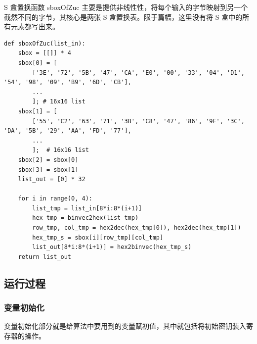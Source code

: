 \vspace*{0.5\baselineskip}
S 盒置换函数 { \cnsls sboxOfZuc} 主要是提供非线性性，将每个输入的字节映射到另一个截然不同的字节，其核心是两张 S 盒置换表。限于篇幅，这里没有将 S 盒中的所有元素都写出来。

\newpage

\begin{lstlisting}[style=myPython,label={lst:sboxofzuc},caption={S 盒置换函数}]
def sboxOfZuc(list_in):
    sbox = [[]] * 4
    sbox[0] = [
        ['3E', '72', '5B', '47', 'CA', 'E0', '00', '33', '04', 'D1', '54', '98', '09', 'B9', '6D', 'CB'], 
        ...
        ]; # 16x16 list
    sbox[1] = [
        ['55', 'C2', '63', '71', '3B', 'C8', '47', '86', '9F', '3C', 'DA', '5B', '29', 'AA', 'FD', '77'], 
        ...
        ];  # 16x16 list
    sbox[2] = sbox[0]
    sbox[3] = sbox[1]
    list_out = [0] * 32

    for i in range(0, 4):
        list_tmp = list_in[8*i:8*(i+1)]
        hex_tmp = binvec2hex(list_tmp)
        row_tmp, col_tmp = hex2dec(hex_tmp[0]), hex2dec(hex_tmp[1])
        hex_tmp_s = sbox[i][row_tmp][col_tmp]
        list_out[8*i:8*(i+1)] = hex2binvec(hex_tmp_s)
    return list_out
\end{lstlisting}


\subsection{运行过程}

\subsubsection{变量初始化}

变量初始化部分就是给算法中要用到的变量赋初值，其中就包括将初始密钥装入寄存器的操作。

